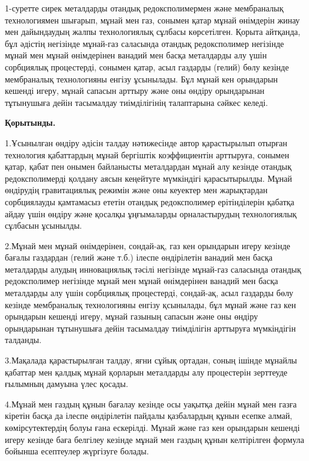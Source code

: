 \begin{multicols}{2}

1-суретте сирек металдарды отандық редоксполимермен және мембраналық
технологиямен шығарып, мұнай мен газ, сонымен қатар мұнай өнімдерін
жинау мен дайындаудың жалпы технологиялық сұлбасы көрсетілген. Қорыта
айтқанда, бұл әдістің негізінде мұнай-газ саласында отандық
редоксполимер негізінде мұнай мен мұнай өнімдерінен ванадий мен басқа
металдарды алу үшін сорбциялық процестерді, сонымен қатар, асыл газдарды
(гелий) бөлу кезінде мембраналық технологияны енгізу ұсынылады. Бұл
мұнай кен орындарын кешенді игеру, мұнай сапасын арттыру және оны өндіру
орындарынан тұтынушыға дейін тасымалдау тиімділігінің талаптарына сәйкес
келеді.

{\bfseries Қорытынды.}

1.Ұсынылған өндіру әдісін талдау нәтижесінде автор қарастырылып отырған
технология қабаттардың мұнай бергіштік коэффициентін арттыруға, сонымен
қатар, қабат пен онымен байланысты металдардан мұнай алу кезінде отандық
редоксполимерді қолдану аясын кеңейтуге мүмкіндігі қарасытырылды. Мұнай
өндірудің гравитациялық режимін және оны кеуектер мен жарықтардан
сорбциялауды қамтамасыз ететін отандық редоксполимер ерітінділерін
қабатқа айдау үшін өндіру және қосалқы ұңғымаларды орналастырудың
технологиялық сұлбасын ұсынылды.

2.Мұнай мен мұнай өнімдерінен, сондай-ақ, газ кен орындарын игеру
кезінде бағалы газдардан (гелий және т.б.) ілеспе өндірілетін ванадий
мен басқа металдарды алудың инновациялық тәсілі негізінде мұнай-газ
саласында отандық редоксполимер негізінде мұнай мен мұнай өнімдерінен
ванадий мен басқа металдарды алу үшін сорбциялық процестерді, сондай-ақ,
асыл газдарды бөлу кезінде мембраналық технологияны енгізу қсынылады,
бұл мұнай және газ кен орындарын кешенді игеру, мұнай газының сапасын
және оны өндіру орындарынан тұтынушыға дейін тасымалдау тиімділігін
арттыруға мүмкіндігін талданды.

3.Мақалада қарастырылған талдау, яғни сұйық ортадан, соның ішінде
мұнайлы қабаттар мен қалдық мұнай қорларын металдарды алу процестерін
зерттеуде ғылымның дамуына үлес қосады.

4.Мұнай мен газдың құнын бағалау кезінде осы уақытқа дейін мұнай мен
газға кіретін басқа да ілеспе өндірілетін пайдалы қазбалардың құнын
есепке алмай, көмірсутектердің болуы ғана ескерілді. Мұнай және газ кен
орындарын кешенді игеру кезінде баға белгілеу кезінде мұнай мен газдың
құнын келтірілген формула бойынша есептеулер жүргізуге болады.
\end{multicols}

